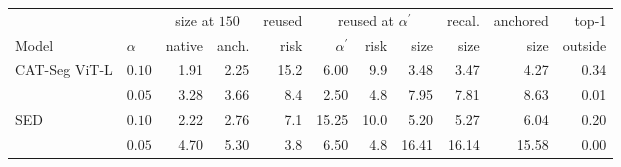 \setlength{\tabcolsep}{3pt}\begin{tabular}{@{}llrrrrrrrrr@{}}
\toprule
& & \multicolumn{2}{c}{size at $150$} & reused & \multicolumn{3}{c}{reused at $\alpha^\prime$} & recal. & anchored & top-1 \\ \cmidrule(lr){3-4}\cmidrule(lr){6-8}
Model & $\alpha$ & native & anch. & risk & $\alpha^\prime$ & risk & size & size & size & outside \\
\midrule
CAT-Seg ViT-L & $0.10$ & 1.91 & 2.25 & 15.2 & 6.00 & 9.9 & 3.48 & 3.47 & 4.27 & 0.34 \\
 & $0.05$ & 3.28 & 3.66 & 8.4 & 2.50 & 4.8 & 7.95 & 7.81 & 8.63 & 0.01 \\
SED & $0.10$ & 2.22 & 2.76 & 7.1 & 15.25 & 10.0 & 5.20 & 5.27 & 6.04 & 0.20 \\
 & $0.05$ & 4.70 & 5.30 & 3.8 & 6.50 & 4.8 & 16.41 & 16.14 & 15.58 & 0.00 \\
\bottomrule
\end{tabular}
